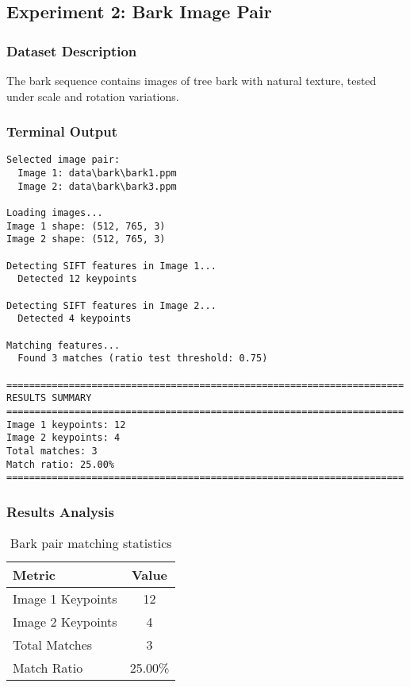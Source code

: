 \documentclass[12pt,a4paper]{article}
\begin{document}
\subsection{Experiment 2: Bark Image Pair}

\subsubsection{Dataset Description}
The bark sequence contains images of tree bark with natural texture, tested under scale and rotation variations.

\subsubsection{Terminal Output}
\begin{lstlisting}
Selected image pair:
  Image 1: data\bark\bark1.ppm
  Image 2: data\bark\bark3.ppm

Loading images...
Image 1 shape: (512, 765, 3)
Image 2 shape: (512, 765, 3)

Detecting SIFT features in Image 1...
  Detected 12 keypoints

Detecting SIFT features in Image 2...
  Detected 4 keypoints

Matching features...
  Found 3 matches (ratio test threshold: 0.75)

======================================================================
RESULTS SUMMARY
======================================================================
Image 1 keypoints: 12
Image 2 keypoints: 4
Total matches: 3
Match ratio: 25.00%
======================================================================
\end{lstlisting}

\subsubsection{Results Analysis}
\begin{table}[H]
\centering
\begin{tabular}{@{}lc@{}}
\toprule
\textbf{Metric} & \textbf{Value} \\
\midrule
Image 1 Keypoints & 12 \\
Image 2 Keypoints & 4 \\
Total Matches & 3 \\
Match Ratio & 25.00\% \\
\bottomrule
\end{tabular}
\caption{Bark pair matching statistics}
\end{table}
\end{document}
